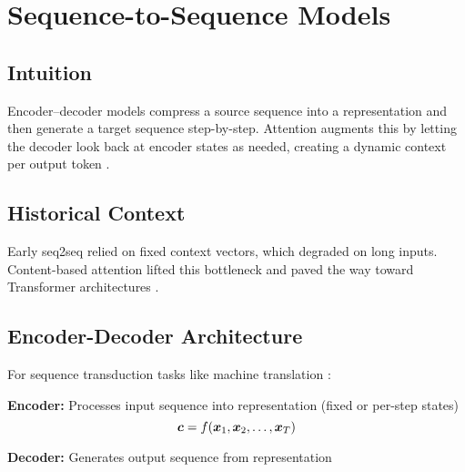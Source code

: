 
\section{Sequence-to-Sequence Models }
\label{sec:seq2seq}

\subsection*{Intuition}

Encoder–decoder models compress a source sequence into a representation and then generate a target sequence step-by-step. Attention augments this by letting the decoder look back at encoder states as needed, creating a dynamic context per output token \cite{Cho2014,Bahdanau2014}.

\subsection*{Historical Context}

Early seq2seq relied on fixed context vectors, which degraded on long inputs. Content-based attention \cite{Bahdanau2014} lifted this bottleneck and paved the way toward Transformer architectures \cite{Vaswani2017}.


\subsection{Encoder-Decoder Architecture}

For sequence transduction tasks like machine translation \cite{Cho2014,Bahdanau2014}:

\textbf{Encoder:} Processes input sequence into representation (fixed or per-step states)
\begin{equation}
\boldsymbol{c} = f(\boldsymbol{x}_1, \boldsymbol{x}_2, \ldots, \boldsymbol{x}_T)
\end{equation}

\textbf{Decoder:} Generates output sequence from representation
